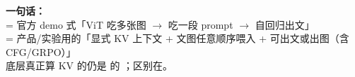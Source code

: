 \begin{summarybox}
\textbf{一句话：}\\
 = 官方 demo 式「ViT 吃多张图 $\to$ 吃一段 prompt $\to$ 自回归出文」\\
 = 产品/实验用的「显式 KV 上下文 + 文图任意顺序喂入 + 可出文或出图（含 CFG/GRPO）」\\[4pt]
底层真正算 KV 的仍是  的 ；区别在。
\end{summarybox}
